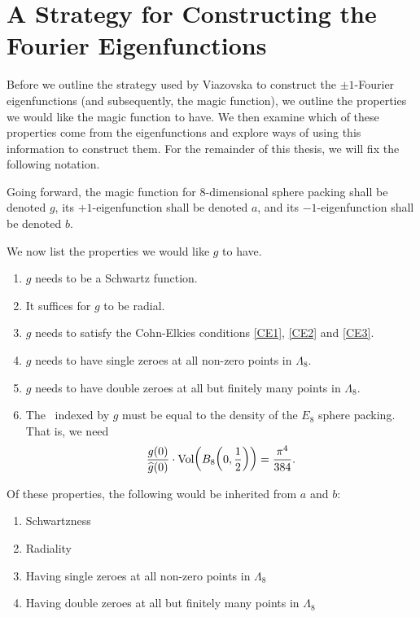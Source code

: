 \section{A Strategy for Constructing the Fourier Eigenfunctions}

Before we outline the strategy used by Viazovska to construct the $\pm 1$-Fourier eigenfunctions (and subsequently, the magic function), we outline the properties we would like the magic function to have. We then examine which of these properties come from the eigenfunctions and explore ways of using this information to construct them. For the remainder of this thesis, we will fix the following notation.

\begin{boxnotation}
    Going forward, the magic function for $8$-dimensional sphere packing shall be denoted $g$, its $+1$-eigenfunction shall be denoted $a$, and its $-1$-eigenfunction shall be denoted $b$.
\end{boxnotation}

We now list the properties we would like $g$ to have.

\begin{enumerate}
    \item $g$ needs to be a Schwartz function.
    \item It suffices for $g$ to be radial.
    \item $g$ needs to satisfy the Cohn-Elkies conditions \ref{CE1}, \ref{CE2} and \ref{CE3}.
    \item $g$ needs to have single zeroes at all non-zero points in $\Lambda_8$.
    \item $g$ needs to have double zeroes at all but finitely many points in $\Lambda_8$.
    \item The \CELP\ indexed by $g$ must be equal to the density of the $E_8$ sphere packing. That is, we need
    \begin{align*}
        \frac{g(0)}{\widehat{g}(0)} \cdot \operatorname{Vol}\!\left( B_8\!\left( 0, \frac{1}{2} \right) \right) = \frac{\pi^4}{384}.
    \end{align*}
\end{enumerate}

Of these properties, the following would be inherited from $a$ and $b$:

\begin{enumerate}
    \item Schwartzness
    \item Radiality
    \item Having single zeroes at all non-zero points in $\Lambda_8$
    \item Having double zeroes at all but finitely many points in $\Lambda_8$
\end{enumerate}

